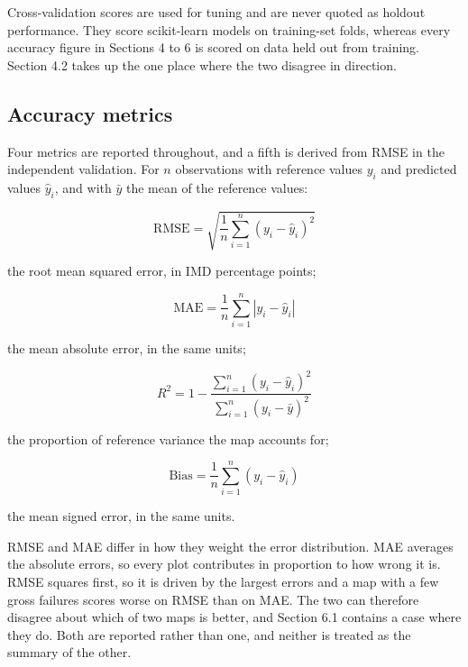 \documentclass[11pt,a4paper]{article}
\begin{document}
Cross-validation scores are used for tuning and are never quoted as holdout
performance. They score scikit-learn models on training-set folds, whereas every
accuracy figure in Sections 4 to 6 is scored on data held out from training.
Section 4.2 takes up the one place where the two disagree in direction.

\subsection{Accuracy metrics}

Four metrics are reported throughout, and a fifth is derived from RMSE in the
independent validation. For $n$ observations with reference values $y_i$ and
predicted values $\hat{y}_i$, and with $\bar{y}$ the mean of the reference values:

\begin{equation}
  \mathrm{RMSE} = \sqrt{\frac{1}{n}\sum_{i=1}^{n}\left(y_i - \hat{y}_i\right)^2}
\end{equation}

the root mean squared error, in IMD percentage points;

\begin{equation}
  \mathrm{MAE} = \frac{1}{n}\sum_{i=1}^{n}\left|y_i - \hat{y}_i\right|
\end{equation}

the mean absolute error, in the same units;

\begin{equation}
  R^2 = 1 - \frac{\sum_{i=1}^{n}\left(y_i - \hat{y}_i\right)^2}
                 {\sum_{i=1}^{n}\left(y_i - \bar{y}\right)^2}
\end{equation}

the proportion of reference variance the map accounts for;

\begin{equation}
  \mathrm{Bias} = \frac{1}{n}\sum_{i=1}^{n}\left(y_i - \hat{y}_i\right)
\end{equation}

the mean signed error, in the same units.

RMSE and MAE differ in how they weight the error distribution. MAE averages the
absolute errors, so every plot contributes in proportion to how wrong it is.
RMSE squares first, so it is driven by the largest errors and a map with a few
gross failures scores worse on RMSE than on MAE. The two can therefore disagree
about which of two maps is better, and Section 6.1 contains a case where they
do. Both are reported rather than one, and neither is treated as the summary of
the other.
\end{document}
